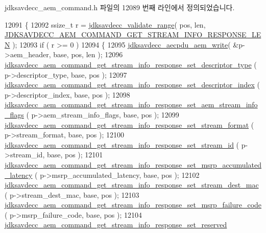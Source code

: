 jdksavdecc\+\_\+aem\+\_\+command.\+h 파일의 12089 번째 라인에서 정의되었습니다.


\begin{DoxyCode}
12091 \{
12092     ssize\_t r = \hyperlink{group__util_ga9c02bdfe76c69163647c3196db7a73a1}{jdksavdecc\_validate\_range}( pos, len, 
      \hyperlink{group__command__get__stream__info__response_gadc90f2ed9487ca14a3d1fbceddaee551}{JDKSAVDECC\_AEM\_COMMAND\_GET\_STREAM\_INFO\_RESPONSE\_LEN} );
12093     \textcolor{keywordflow}{if} ( r >= 0 )
12094     \{
12095         \hyperlink{group__aecpdu__aem_gad658e55771cce77cecf7aae91e1dcbc5}{jdksavdecc\_aecpdu\_aem\_write}( &p->aem\_header, base, pos, len );
12096         \hyperlink{group__command__get__stream__info__response_ga9c677221e150e2b371c086c33c204cbb}{jdksavdecc\_aem\_command\_get\_stream\_info\_response\_set\_descriptor\_type}
      ( p->descriptor\_type, base, pos );
12097         \hyperlink{group__command__get__stream__info__response_gaba36240babe27f304c23f512f1f5beae}{jdksavdecc\_aem\_command\_get\_stream\_info\_response\_set\_descriptor\_index}
      ( p->descriptor\_index, base, pos );
12098         
      \hyperlink{group__command__get__stream__info__response_gadaa336cd606947b0757c0f6a88ff192b}{jdksavdecc\_aem\_command\_get\_stream\_info\_response\_set\_aem\_stream\_info\_flags}
      ( p->aem\_stream\_info\_flags, base, pos );
12099         \hyperlink{group__command__get__stream__info__response_gafaa9294ecbd6f3e27d47016cc1aa3ebe}{jdksavdecc\_aem\_command\_get\_stream\_info\_response\_set\_stream\_format}
      ( p->stream\_format, base, pos );
12100         \hyperlink{group__command__get__stream__info__response_ga5b88824a01fd1557fd8d9c9af0902de8}{jdksavdecc\_aem\_command\_get\_stream\_info\_response\_set\_stream\_id}
      ( p->stream\_id, base, pos );
12101         
      \hyperlink{group__command__get__stream__info__response_gae5d24383ac04e508fe222a7d9231d9c8}{jdksavdecc\_aem\_command\_get\_stream\_info\_response\_set\_msrp\_accumulated\_latency}
      ( p->msrp\_accumulated\_latency, base, pos );
12102         \hyperlink{group__command__get__stream__info__response_gab7b570d46123ac09475d95c447605e5d}{jdksavdecc\_aem\_command\_get\_stream\_info\_response\_set\_stream\_dest\_mac}
      ( p->stream\_dest\_mac, base, pos );
12103         \hyperlink{group__command__get__stream__info__response_ga696d62227335e8bebc49ca8d40a3ce21}{jdksavdecc\_aem\_command\_get\_stream\_info\_response\_set\_msrp\_failure\_code}
      ( p->msrp\_failure\_code, base, pos );
12104         \hyperlink{group__command__get__stream__info__response_ga74780a919f6ff23fc9b66453700abd57}{jdksavdecc\_aem\_command\_get\_stream\_info\_response\_set\_reserved}

\end{DoxyCode}
